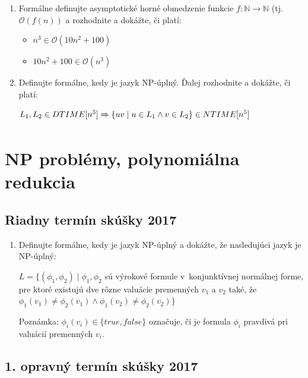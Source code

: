 \documentclass[11pt,a4paper]{article}
\begin{document}
		\begin{enumerate}
			\item Formálne definujte asymptotické horné obmedzenie funkcie $f: \mathbb{N} \rightarrow \mathbb{N}$ (tj. $\mathcal{O}(f(n))$ a rozhodnite a dokážte, či platí:
			
			\begin{itemize}
				\item $n^3 \in \mathcal{O}(10n^2 + 100)$
				\item $10n^2 + 100 \in \mathcal{O}(n^3)$
			\end{itemize}
			
			\item Definujte formálne, kedy je jazyk NP-úplný. Ďalej rozhodnite a dokážte, či platí:
			
			$L_1, L_2 \in DTIME[n^5] \xRightarrow[]{} \{ uv \mid u \in  L_1 \land v \in L_2\} \in NTIME[n^5]$
		\end{enumerate}	

	\section{NP problémy, polynomiálna redukcia}

		\subsection{Riadny termín skúšky 2017}

		\begin{enumerate}
			\item Definujte formálne, kedy je jazyk NP-úplný a dokážte, že nasledujúci jazyk je NP-úplný:
	
			$L = \{(\phi_1, \phi_2) \mid \phi_1, \phi_2$ sú výrokové formule v~konjunktívnej normálnej forme, pre ktoré existujú dve rôzne valuácie premenných $v_1$ a $v_2$ také, že $\phi_1(v_1) \neq \phi_2(v_1) \land \phi_1(v_2) \neq \phi_2(v_2)\}$
	
			Poznámka: $\phi_i(v_i) \in \{true, false\}$ označuje, či je formula $\phi_i$ pravdivá pri valuácií premenných $v_i$.
		\end{enumerate}	

		\subsection{1. opravný termín skúšky 2017}
\end{document}
